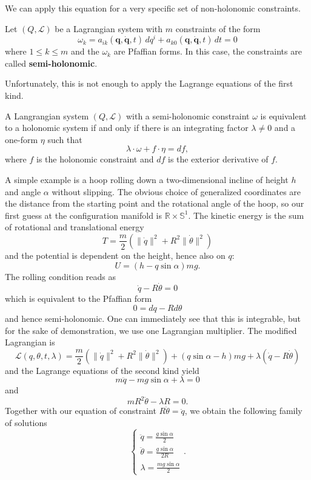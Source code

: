 We can apply this equation for a very specific set of non-holonomic constraints.
\begin{definition}
    Let $(Q, \mathcal{L})$ be a Lagrangian system with $m$ constraints of the form 
    \[
        \omega_k = a_{ik}(\mathbf{q},\dot{\mathbf{q}},t) \, dq^i + a_{k0}(\mathbf{q},\dot{\mathbf{q}},t) \, dt = 0
    \] where $1 \leq k \leq m$ and the $\omega_k$ are Pfaffian forms. In this case, the constraints are called \textbf{semi-holonomic}.  
\end{definition}
Unfortunately, this is not enough to apply the Lagrange equations of the first kind.
\begin{theorem}
    A Langrangian system $(Q, \mathcal{L})$ with a semi-holonomic constraint $\omega$ is equivalent to a holonomic system if and only if there is an integrating factor $\lambda \neq 0$ and a one-form $\eta$ such that
    \[
    \lambda \cdot \omega + f \cdot \eta = df,
    \] where $f$ is the holonomic constraint and $df$ is the exterior derivative of $f$. 
\end{theorem}
\begin{eg}
    A simple example is a hoop rolling down a two-dimensional incline of height $h$ and angle $\alpha$ without slipping. The obvious choice of generalized coordinates are the distance from the starting point and the rotational angle of the hoop, so our first guess at the configuration manifold is $\mathbb{R} \times \mathbb{S}^1$. The kinetic energy is the sum of rotational and translational energy
\[
    T= \frac{m}{2}(\|\dot{q}\|^2+R^2 \|\dot{\theta}\|^2)
\] and the potential is dependent on the height, hence also on $q$:
\[
U= (h-q \sin \alpha)mg
.\] The rolling condition reads as
\[
    \dot{q} - R \dot{\theta}=0
\] which is equivalent to the Pfaffian form
\[
0 = dq-Rd\theta
\] and hence semi-holonomic. One can immediately see that this is integrable, but for the sake of demonstration, we use one Lagrangian multiplier. The modified Lagrangian is
\[
    \mathcal{L}(q,\theta,t,\lambda)=\frac{m}{2}(\|\dot{q}\|^2 + R^2 \|\dot{\theta}\|^2) + (q \sin \alpha - h)mg + \lambda (\dot{q}-R\dot{\theta})
\] and the Lagrange equations of the second kind yield
\[
    m\ddot{q}-mg \sin \alpha + \lambda = 0
\] and \[
m R^2 \ddot{\theta}-\lambda R =0
.\]  Together with our equation of constraint $R \ddot{\theta}= \ddot{q}$, we obtain the following family of solutions
\[
\begin{cases}
    \ddot{q}= \frac{g \sin \alpha}{2}\\
    \ddot{\theta} = \frac{g \sin \alpha}{2R}\\
    \lambda = \frac{mg \sin \alpha}{2}
\end{cases}
.\]  
\end{eg}
